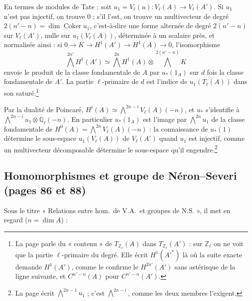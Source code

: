 \documentclass[11pt,a4paper]{article}
\begin{document}
En termes de modules de Tate : soit $u_{1} = V_{\ell}(u) \colon V_{\ell}(A) \to
V_{\ell}(A')$. Si $u_{1}$ n'est pas injectif, on trouve $0$ ; s'il l'est, on
trouve un multivecteur de degré $2(n'-n) = \dim\operatorname{Coker} u_{1}$,
c'est-à-dire une forme alternée de degré $2(n'-n)$ sur $V_{\ell}(A')$, nulle sur
$u_{1}(V_{\ell}(A))$, déterminée à un scalaire près, et normalisée ainsi : si $0
\to K \to H^{1}(A') \to H^{1}(A) \to 0$, l'isomorphisme
\[
\bigwedge^{2n'}H^{1}(A') \simeq \bigwedge^{2n}H^{1}(A) \otimes
\bigwedge^{2(n'-n)}K
\]
envoie le produit de la classe fondamentale de $A$ par $u_{*}(1_{A})$ sur $d$
fois la classe fondamentale de $A'$. La partie $\ell$-primaire de $d$ est
l'indice de $u_{1}(T_{\ell}(A))$ dans son saturé.\footnote{La page parle du
« contenu » de $T_{\mathbb{Z}_{\ell}}(A)$ dans $T_{\mathbb{Z}_{\ell}}(A')$ :
sur $\mathbb{Z}_{\ell}$ on ne voit que la partie $\ell$-primaire du degré. Elle
écrit $H^{1}(A'^{*})$ là où la suite exacte demande $H^{1}(A')$, comme le
confirme le $H^{2n'}(A')$ sans astérisque de la ligne suivante, et
$C^{n'-n}(A)$ pour $C^{n'-n}(A')$.}

Par la dualité de Poincaré, $H^{i}(A) \simeq \bigwedge^{2n-i}V_{\ell}(A)(-n)$,
et $u_{*}$ s'identifie à $\bigwedge^{2n-i}u_{1} \otimes \mathbb{Q}_{\ell}(-n)$.
En particulier $u_{*}(1_{A})$ est l'image par $\bigwedge^{2n}u_{1}$ de la classe
fondamentale de $H^{0}(A) = \bigwedge^{2n}V_{\ell}(A)(-n)$ : la connaissance de
$u_{*}(1)$ détermine le sous-espace $u_{1}(V_{\ell}(A))$ de $V_{\ell}(A')$ quand
$u_{1}$ est injectif, comme un multivecteur décomposable détermine le
sous-espace qu'il engendre.\footnote{La page écrit $\bigwedge^{2n-1}u_{1}$ ;
c'est $\bigwedge^{2n-i}$, comme les deux membres l'exigent.}

\subsection*{Homomorphismes et groupe de Néron--Severi (pages 86 et 88)}

Sous le titre « Relations entre hom.\ de V.A.\ et groupes de N.S. », il met en
regard ($n = \dim A$) :

\end{document}
